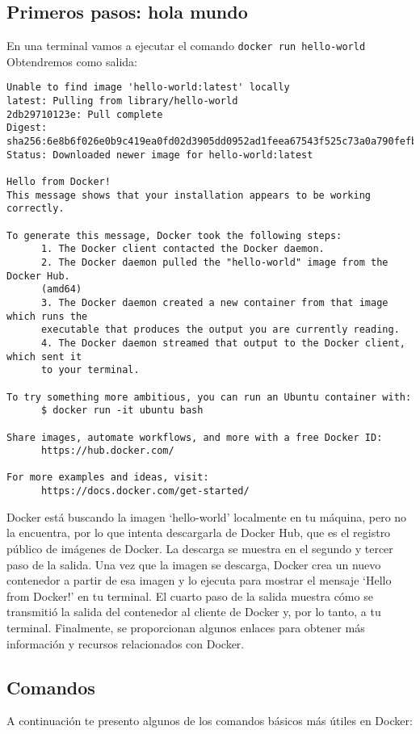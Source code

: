 \documentclass{article}
\begin{document}
\subsection{Primeros pasos: hola mundo}
En una terminal vamos a ejecutar el comando \lstinline{docker run hello-world}\\
Obtendremos como salida:
\begin{lstlisting}[numbers=none]
Unable to find image 'hello-world:latest' locally
latest: Pulling from library/hello-world
2db29710123e: Pull complete 
Digest: sha256:6e8b6f026e0b9c419ea0fd02d3905dd0952ad1feea67543f525c73a0a790fefb
Status: Downloaded newer image for hello-world:latest

Hello from Docker!
This message shows that your installation appears to be working correctly.

To generate this message, Docker took the following steps:
      1. The Docker client contacted the Docker daemon.
      2. The Docker daemon pulled the "hello-world" image from the Docker Hub.
      (amd64)
      3. The Docker daemon created a new container from that image which runs the
      executable that produces the output you are currently reading.
      4. The Docker daemon streamed that output to the Docker client, which sent it
      to your terminal.

To try something more ambitious, you can run an Ubuntu container with:
      $ docker run -it ubuntu bash

Share images, automate workflows, and more with a free Docker ID:
      https://hub.docker.com/

For more examples and ideas, visit:
      https://docs.docker.com/get-started/      
\end{lstlisting}
Docker está buscando la imagen \enquote*{hello-world} localmente en tu máquina, pero no la encuentra, por lo que intenta descargarla de Docker Hub, que es el registro público de imágenes de Docker. La descarga se muestra en el segundo y tercer paso de la salida. Una vez que la imagen se descarga, Docker crea un nuevo contenedor a partir de esa imagen y lo ejecuta para mostrar el mensaje \enquote*{Hello from Docker!} en tu terminal. El cuarto paso de la salida muestra cómo se transmitió la salida del contenedor al cliente de Docker y, por lo tanto, a tu terminal. Finalmente, se proporcionan algunos enlaces para obtener más información y recursos relacionados con Docker.

\subsection{Comandos}
A continuación te presento algunos de los comandos básicos más útiles en Docker:
\end{document}
